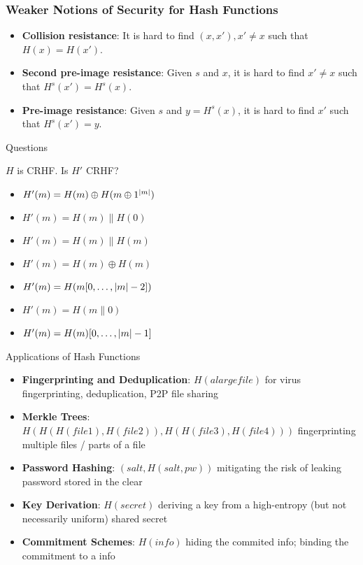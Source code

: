 \begin{frame}\frametitle{Weaker Notions of Security for Hash Functions}
\begin{figure}
\begin{center}

\end{center}
\end{figure}
\begin{itemize}
\item \textbf{Collision resistance}: It is hard to find $(x, x'), x' \ne x$ such that $H(x) = H(x')$.
\item \textbf{Second pre-image resistance}: Given $s$ and $x$, it is hard to find $x' \ne x$ such that $H^s(x') = H^s(x)$.
\item \textbf{Pre-image resistance}: Given $s$ and $y = H^s(x)$, it is hard to find $x'$ such that $H^s(x')=y$.
\end{itemize}
\end{frame}
\begin{frame}{Questions}
\begin{exampleblock}{$H$ is CRHF. Is $H'$ CRHF?}
\begin{itemize}
\item $H'(m) = H(m)\oplus H(m\oplus 1^{\lvert m\rvert})$ %
\item $H'(m) = H(m)\| H(0)$
\item $H'(m) = H(m)\| H(m)$
\item $H'(m) = H(m) \oplus H(m)$
\item $H'(m) = H(m[0,\dots,\lvert m\rvert-2])$
\item $H'(m) = H(m\| 0)$
\item $H'(m) = H(m)[0,\dots,\lvert m\rvert-1]$ %
\end{itemize}
\end{exampleblock}
\end{frame}
\begin{frame}{Applications of Hash Functions}
\begin{itemize}
\item \textbf{Fingerprinting and Deduplication}: $H(alargefile)$ for virus fingerprinting, deduplication, P2P file sharing
\item \textbf{Merkle Trees}: $H(H(H(file1), H(file2)), H(H(file3), H(file4)))$ fingerprinting multiple files / parts of a file
\item \textbf{Password Hashing}: $(salt, H(salt, pw))$ mitigating the risk of leaking password stored in the clear 
\item \textbf{Key Derivation}: $H(secret)$ deriving a key from a high-entropy (but not necessarily uniform) shared secret
\item \textbf{Commitment Schemes}: $H(info)$ hiding the commited info; binding the commitment to a info
\end{itemize}
\end{frame}
